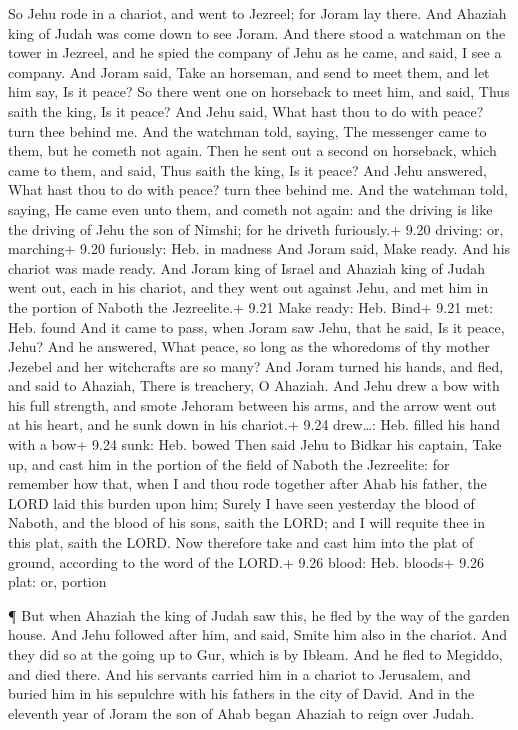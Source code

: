  So Jehu rode in a chariot, and went to Jezreel; for Joram
lay there. And Ahaziah king of Judah was come down to see Joram.
 And there stood a watchman on the tower in Jezreel, and he
spied the company of Jehu as he came, and said, I see a company. And
Joram said, Take an horseman, and send to meet them, and let him say, Is
it peace?  So there went one on horseback to meet him, and
said, Thus saith the king, Is it peace? And Jehu said, What hast thou to
do with peace? turn thee behind me. And the watchman told, saying, The
messenger came to them, but he cometh not again.  Then he
sent out a second on horseback, which came to them, and said, Thus saith
the king, Is it peace? And Jehu answered, What hast thou to do with
peace? turn thee behind me.  And the watchman told, saying,
He came even unto them, and cometh not again: and the driving is like
the driving of Jehu the son of Nimshi; for he driveth furiously.+ 9.20
driving: or, marching+ 9.20 furiously: Heb. in madness  And
Joram said, Make ready. And his chariot was made ready. And Joram king
of Israel and Ahaziah king of Judah went out, each in his chariot, and
they went out against Jehu, and met him in the portion of Naboth the
Jezreelite.+ 9.21 Make ready: Heb. Bind+ 9.21 met: Heb. found
 And it came to pass, when Joram saw Jehu, that he said, Is
it peace, Jehu? And he answered, What peace, so long as the whoredoms of
thy mother Jezebel and her witchcrafts are so many?  And
Joram turned his hands, and fled, and said to Ahaziah, There is
treachery, O Ahaziah.  And Jehu drew a bow with his full
strength, and smote Jehoram between his arms, and the arrow went out at
his heart, and he sunk down in his chariot.+ 9.24 drew\ldots: Heb.
filled his hand with a bow+ 9.24 sunk: Heb. bowed  Then
said Jehu to Bidkar his captain, Take up, and cast him in the portion of
the field of Naboth the Jezreelite: for remember how that, when I and
thou rode together after Ahab his father, the LORD laid this burden upon
him;  Surely I have seen yesterday the blood of Naboth, and
the blood of his sons, saith the LORD; and I will requite thee in this
plat, saith the LORD. Now therefore take and cast him into the plat of
ground, according to the word of the LORD.+ 9.26 blood: Heb. bloods+
9.26 plat: or, portion

 ¶ But when Ahaziah the king of Judah saw this, he fled by
the way of the garden house. And Jehu followed after him, and said,
Smite him also in the chariot. And they did so at the going up to Gur,
which is by Ibleam. And he fled to Megiddo, and died there.
 And his servants carried him in a chariot to Jerusalem,
and buried him in his sepulchre with his fathers in the city of David.
 And in the eleventh year of Joram the son of Ahab began
Ahaziah to reign over Judah.

